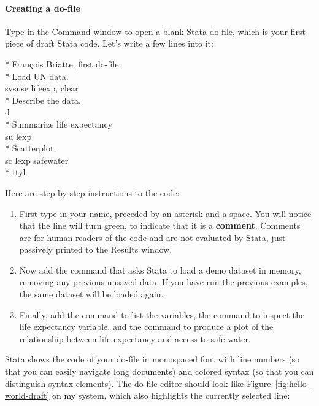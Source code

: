 %
%
\paragraph{Creating a do-file}

Type  in the Command window to open a blank Stata do-file, which is your first piece of draft Stata code. Let's write a few lines into it:%

\begin{docspec}
  * François Briatte, first do-file\\[1em]%
  * Load UN data.\\%
  sysuse lifeexp, clear\\[1em]%
  * Describe the data.\\%
  d\\[1em]%
  * Summarize life expectancy\\%
  su lexp\\[1em]%
  * Scatterplot.\\%
  sc lexp safewater\\[1em]%
  * ttyl\\
\end{docspec}

Here are step-by-step instructions to the code:

\begin{enumerate}
  \item First type in your name, preceded by an asterisk and a space. You will notice that the line will turn green, to indicate that it is a \textbf{comment}. Comments are for human readers of the code and are not evaluated by Stata, just passively printed to the Results window.%
  
  \item Now add the  command that asks Stata to load a demo dataset in memory, removing any previous unsaved data. If you have run the previous examples, the same dataset will be loaded again.%
  
  \item Finally, add the  command to list the variables, the  command to inspect the life expectancy variable, and the  command to produce a plot of the relationship between life expectancy and access to safe water.%
\end{enumerate}

Stata shows the code of your do-file in monospaced font with line numbers (so that you can easily navigate long documents) and colored syntax (so that you can distinguish syntax elements). The do-file editor should look like Figure~\ref{fig:hello-world-draft} on my system, which also highlights the currently selected line:%

